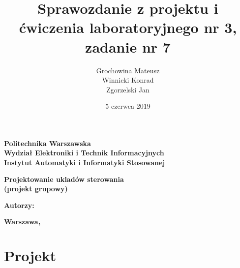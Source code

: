 \documentclass[a4paper,titlepage,11pt,twosides,floatssmall]{mwrep}
\begin{document}
\frenchspacing
\pagestyle{uheadings}

\title{\bf Sprawozdanie z projektu i ćwiczenia laboratoryjnego nr 3, zadanie nr 7\vskip 0.1cm}
\author{Grochowina Mateusz\\Winnicki Konrad\\Zgorzelski Jan}
\date{5 czerwca 2019}

\makeatletter
\renewcommand{\maketitle}{\begin{titlepage}
\begin{center}
{\LARGE {\bf Politechnika Warszawska}}\\
\vspace{0.4cm}
{\LARGE {\bf Wydział Elektroniki i Technik Informacyjnych}}\\
\vspace{0.2cm}
{\LARGE {\bf Instytut Automatyki i Informatyki Stosowanej}}\\
\end{center}
\vspace{5cm}
\begin{center}
{\bf \LARGE Projektowanie ukladów sterowania\\ (projekt grupowy) \vskip 0.1cm}
\end{center}
\vspace{1cm}
\begin{center}
{\bf \LARGE \@title}
\end{center}
\vspace{7cm}
{\bf Autorzy:\\ \Large \@author \par}
\vspace*{\stretch{6}}
\begin{center}
\bf{\large{Warszawa, \@date\vskip 0.1cm}}
\end{center}
\end{titlepage}
}
\makeatother

\maketitle

\tableofcontents
\chapter{Projekt}
\lstset{style=custommatlab}






\end{document}
